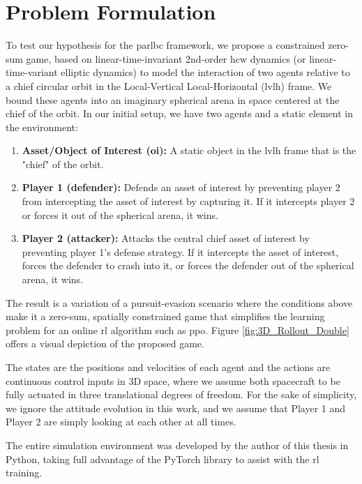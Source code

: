 \chapter{Problem Formulation}
\label{chap:Problem_Formulation}

To test our hypothesis for the \acs{parlbc} framework, we propose a constrained zero-sum game, based on linear-time-invariant 2nd-order \acs{hcw} dynamics (or linear-time-variant elliptic dynamics) to model the interaction of two agents relative to a chief circular orbit in the Local-Vertical Local-Horizontal (\acs{lvlh}) frame. We bound these agents into an imaginary spherical arena in space centered at the chief of the orbit. In our initial setup, we have two agents and a static element in the environment:

\begin{enumerate}
\item \textbf{Asset/Object of Interest (\acs{oi}):} A static object in the \acs{lvlh} frame that is the "chief" of the orbit. 
\item \textbf{Player 1 (defender):} Defends an asset of interest by preventing player 2 from intercepting the asset of interest by capturing it. If it intercepts player 2 or forces it out of the spherical arena, it wins. 
\item \textbf{Player 2 (attacker):} Attacks the central chief asset of interest by preventing player 1's defense strategy. If it intercepts the asset of interest, forces the defender to crash into it, or forces the defender out of the spherical arena, it wins.
\end{enumerate}

The result is a variation of a pursuit-evasion scenario where the conditions above make it a zero-sum, spatially constrained game that simplifies the learning problem for an online \acs{rl} algorithm such as \acs{ppo}. Figure \ref{fig:3D_Rollout_Double} offers a visual depiction of the proposed game.

The states are the positions and velocities of each agent and the actions are continuous control inputs in 3D space, where we assume both spacecraft to be fully actuated in three translational degrees of freedom. For the sake of simplicity, we ignore the attitude evolution in this work, and we assume that Player 1 and Player 2 are simply looking at each other at all times.

The entire simulation environment was developed by the author of this thesis in Python, taking full advantage of the PyTorch library to assist with the \acs{rl} training. 

